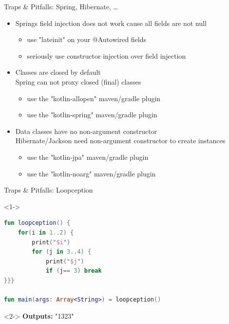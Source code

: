 \begin{frame}{Traps \& Pitfalls: Spring, Hibernate, \dots}
	\begin{itemize}
		\item Springs field injection does not work cause all fields are not null
		\begin{itemize}
			\item use "lateinit" on your @Autowired fields
			\item seriously use constructor injection over field injection
		\end{itemize}
		\item Classes are closed by default\\
		Spring can not proxy closed (final) classes
		\begin{itemize}
			\item use the "kotlin-allopen" maven/gradle plugin
			\item use the "kotlin-spring" maven/gradle plugin
		\end{itemize}
		\item Data classes have no non-argument constructor\\
		Hibernate/Jackson need non-argument constructor to create instances
		\begin{itemize}
			\item use the "kotlin-jpa" maven/gradle plugin
			\item use the "kotlin-noarg" maven/gradle plugin
		\end{itemize}
	\end{itemize}
\end{frame}

\begin{frame}[fragile]{Traps \& Pitfalls: Loopception}
	\begin{overlayarea}{\textwidth}{\textheight}
		\begin{onlyenv}<1->
			\begin{lstlisting}[language=Kotlin]
fun loopception() {
	for(i in 1..2) {
		print("$i")
		for (j in 3..4) {
			print("$j")
			if (j== 3) break
}}}

fun main(args: Array<String>) = loopception()
			\end{lstlisting}
		\end{onlyenv}
		\begin{onlyenv}<2->
			\textbf{Outputs:} "1323"
		\end{onlyenv}
	\end{overlayarea}
\end{frame}

